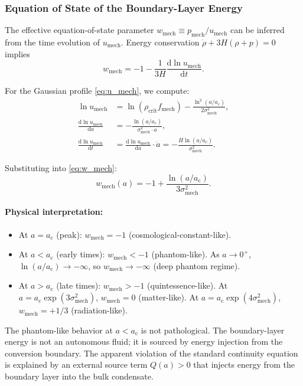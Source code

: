 \documentclass[11pt,a4paper]{article}
\newcommand{\dx}{\mathrm{d}}
\newcommand{\ac}{a_{\mathrm{c}}}
\newcommand{\sigmamech}{\sigma_{\mathrm{mech}}}
\newcommand{\fmech}{f_{\mathrm{mech}}}
\newcommand{\umech}{u_{\mathrm{mech}}}
\newcommand{\rhocrit}{\rho_{\mathrm{crit}}}
\theoremstyle{definition}
\begin{document}
\subsubsection{Equation of State of the Boundary-Layer Energy}
\label{sec:w_mech_derivation}

The effective equation-of-state parameter $w_{\mathrm{mech}} \equiv p_{\mathrm{mech}}/\umech$ can be inferred from the time evolution of $\umech$. Energy conservation $\dot{\rho} + 3H(\rho + p) = 0$ implies
\begin{equation}
\label{eq:w_mech}
w_{\mathrm{mech}} = -1 - \frac{1}{3H} \frac{\dx \ln \umech}{\dx t}.
\end{equation}

For the Gaussian profile \eqref{eq:u_mech}, we compute:
\begin{align}
\ln \umech &= \ln(\rhocrit \fmech) - \frac{\ln^2(a/\ac)}{2\sigmamech^2}, \\
\frac{\dx \ln \umech}{\dx a} &= -\frac{\ln(a/\ac)}{\sigmamech^2 \cdot a}, \\
\frac{\dx \ln \umech}{\dx t} &= \frac{\dx \ln \umech}{\dx a} \cdot \dot{a} = -\frac{H \ln(a/\ac)}{\sigmamech^2}.
\end{align}

Substituting into \eqref{eq:w_mech}:
\begin{equation}
\label{eq:wmech_result}
\boxed{w_{\mathrm{mech}}(a) = -1 + \frac{\ln(a/\ac)}{3\sigmamech^2}.}
\end{equation}

\paragraph{Physical interpretation:}
\begin{itemize}[leftmargin=1.8em]
  \item At $a = \ac$ (peak): $w_{\mathrm{mech}} = -1$ (cosmological-constant-like).
  \item At $a < \ac$ (early times): $w_{\mathrm{mech}} < -1$ (phantom-like). As $a \to 0^+$, $\ln(a/\ac) \to -\infty$, so $w_{\mathrm{mech}} \to -\infty$ (deep phantom regime).
  \item At $a > \ac$ (late times): $w_{\mathrm{mech}} > -1$ (quintessence-like). At $a = \ac \exp(3\sigmamech^2)$, $w_{\mathrm{mech}} = 0$ (matter-like). At $a = \ac \exp(4\sigmamech^2)$, $w_{\mathrm{mech}} = +1/3$ (radiation-like).
\end{itemize}

The phantom-like behavior at $a < \ac$ is not pathological. The boundary-layer energy is not an autonomous fluid; it is sourced by energy injection from the conversion boundary. The apparent violation of the standard continuity equation is explained by an external source term $Q(a) > 0$ that injects energy from the boundary layer into the bulk condensate.
\end{document}
